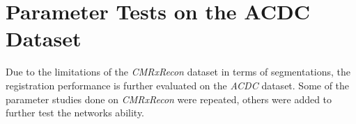 \documentclass[english,version-2022-01]{uzl-thesis} %
\begin{document}
%
%
%

\section{Parameter Tests on the ACDC Dataset} \label{Sec:ResultsParameterTestsACDC}
Due to the limitations of the \emph{CMRxRecon} dataset in terms of segmentations, the registration performance is further evaluated on the \emph{ACDC} dataset. Some of the parameter studies done on \emph{CMRxRecon} were repeated, others were added to further test the networks ability.
\end{document}

